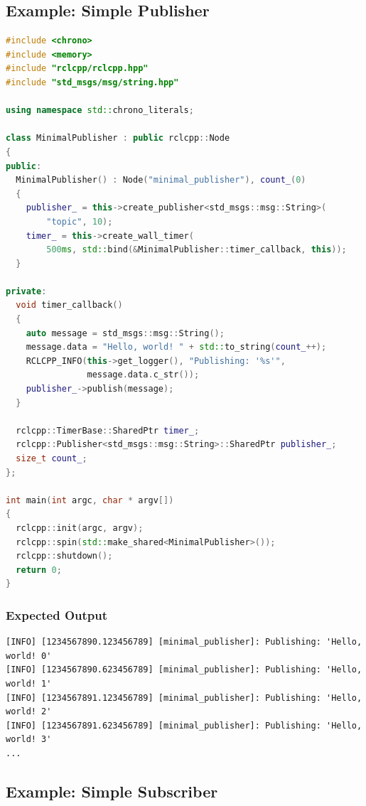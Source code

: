 \documentclass[a4paper,12pt]{book}
\begin{document}
\subsection{Example: Simple Publisher}

\begin{lstlisting}[language=CPP, caption=Simple Publisher in C++]
#include <chrono>
#include <memory>
#include "rclcpp/rclcpp.hpp"
#include "std_msgs/msg/string.hpp"

using namespace std::chrono_literals;

class MinimalPublisher : public rclcpp::Node
{
public:
  MinimalPublisher() : Node("minimal_publisher"), count_(0)
  {
    publisher_ = this->create_publisher<std_msgs::msg::String>(
        "topic", 10);
    timer_ = this->create_wall_timer(
        500ms, std::bind(&MinimalPublisher::timer_callback, this));
  }

private:
  void timer_callback()
  {
    auto message = std_msgs::msg::String();
    message.data = "Hello, world! " + std::to_string(count_++);
    RCLCPP_INFO(this->get_logger(), "Publishing: '%s'", 
                message.data.c_str());
    publisher_->publish(message);
  }
  
  rclcpp::TimerBase::SharedPtr timer_;
  rclcpp::Publisher<std_msgs::msg::String>::SharedPtr publisher_;
  size_t count_;
};

int main(int argc, char * argv[])
{
  rclcpp::init(argc, argv);
  rclcpp::spin(std::make_shared<MinimalPublisher>());
  rclcpp::shutdown();
  return 0;
}
\end{lstlisting}

\subsubsection{Expected Output}
\begin{verbatim}
[INFO] [1234567890.123456789] [minimal_publisher]: Publishing: 'Hello, world! 0'
[INFO] [1234567890.623456789] [minimal_publisher]: Publishing: 'Hello, world! 1'
[INFO] [1234567891.123456789] [minimal_publisher]: Publishing: 'Hello, world! 2'
[INFO] [1234567891.623456789] [minimal_publisher]: Publishing: 'Hello, world! 3'
...
\end{verbatim}

\subsection{Example: Simple Subscriber}
\end{document}
